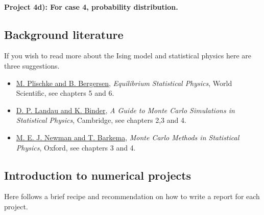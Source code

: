 \documentclass[10pt,showpacs,preprintnumbers,footinbib,amsmath,amssymb,aps,prl,twocolumn,groupedaddress,superscriptaddress,showkeys]{revtex4-1}
\begin{document}
\paragraph{Project 4d): For case 4, probability distribution.}


\subsection*{Background literature}

If you wish to read more about the Ising model and statistical physics here are three suggestions.

\begin{itemize}
  \item \href{{http://www.worldscientific.com/worldscibooks/10.1142/5660}}{M. Plischke and B. Bergersen}, \emph{Equilibrium Statistical Physics}, World Scientific, see chapters 5 and 6.

  \item \href{{http://www.cambridge.org/no/academic/subjects/physics/computational-science-and-modelling/guide-monte-carlo-simulations-statistical-physics-4th-edition?format=HB}}{D. P. Landau and K. Binder}, \emph{A Guide to Monte Carlo Simulations in Statistical Physics}, Cambridge, see chapters 2,3 and 4.

  \item \href{{https://global.oup.com/academic/product/monte-carlo-methods-in-statistical-physics-9780198517979?cc=no&lang=en&}}{M. E. J. Newman and T. Barkema}, \emph{Monte Carlo Methods in Statistical Physics}, Oxford, see chapters 3 and 4.
\end{itemize}

\noindent
\subsection*{Introduction to numerical projects}

Here follows a brief recipe and recommendation on how to write a report for each
project.
\end{document}
